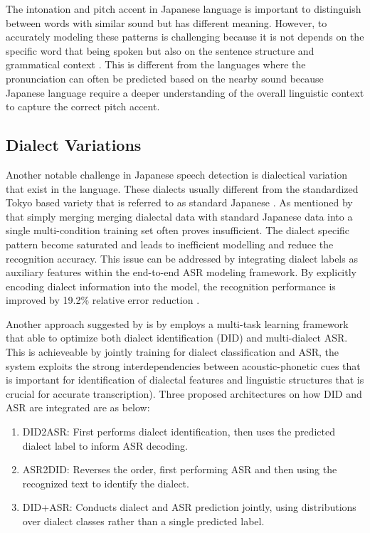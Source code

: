 The intonation and pitch accent in Japanese language is important to distinguish between words with similar sound but has different meaning. However, to accurately modeling these patterns is challenging because it is not depends on the specific word that being spoken but also on the sentence structure and grammatical context \parencite{yasuda2022}. This is different from the languages where the pronunciation can often be predicted based on the nearby sound because Japanese language require a deeper understanding of the overall linguistic context to capture the correct pitch accent.



\subsection{Dialect Variations}  
Another notable challenge in Japanese speech detection is dialectical variation that exist in the language. These dialects usually different from the standardized Tokyo based variety that is referred to as standard Japanese \parencite{takahashi2024comparison}. As mentioned by \textcite{Imaizumi2020Dialect-Aware} that simply merging merging dialectal data with standard Japanese data into a single multi-condition training set often proves insufficient. The dialect specific pattern become saturated and leads to inefficient modelling and reduce the recognition accuracy. This issue can be addressed by integrating dialect labels as auxiliary features within the end-to-end ASR modeling framework. By explicitly encoding dialect information into the model, the recognition performance is improved by 19.2\% relative error reduction \parencite{Imaizumi2020Dialect-Aware}.

Another approach suggested by \textcite{imaizumi2022} is by employs a multi-task learning framework that able to optimize both dialect identification (DID) and multi-dialect ASR. This is achieveable by jointly training for dialect classification and ASR, the system exploits the strong interdependencies between acoustic-phonetic cues that is important for identification of dialectal features and linguistic structures that is crucial for accurate transcription). Three proposed architectures on how DID and ASR are integrated are as below:

\begin{enumerate}
    \item DID2ASR: First performs dialect identification, then uses the predicted dialect label to inform ASR decoding. 
    \item ASR2DID: Reverses the order, first performing ASR and then using the recognized text to identify the dialect. 
    \item DID+ASR: Conducts dialect and ASR prediction jointly, using distributions over dialect classes rather than a single predicted label.
\end{enumerate}

